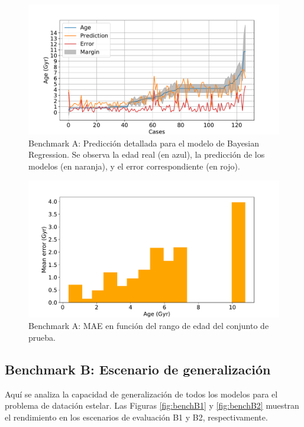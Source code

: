 \begin{figure}[H]
\begin{center}
 \includegraphics[width=0.8\linewidth]{Figuras/Experimentos/B_A_bayes_2.pdf}
\end{center}
\caption{Benchmark A: Predicción detallada para el modelo de Bayesian Regression. Se observa la edad real (en azul), la predicción de los modelos (en naranja), y el error correspondiente (en rojo).}
 \label{fig:benchA_details_bayes_2}
\end{figure}

\begin{figure}[H]
\begin{center}
 \includegraphics[width=0.8\linewidth]{Figuras/Experimentos/B_A_bayes_3.pdf}
\end{center}
\caption{Benchmark A: MAE en función del rango de edad del conjunto de prueba.}
 \label{fig:benchA_details_bayes_3}
\end{figure}


\subsection{Benchmark B: Escenario de generalización}

Aquí se analiza la capacidad de generalización de todos los modelos para el problema de datación estelar. Las Figuras \ref{fig:benchB1} y \ref{fig:benchB2} muestran el rendimiento en los escenarios de evaluación B1 y B2, respectivamente.

